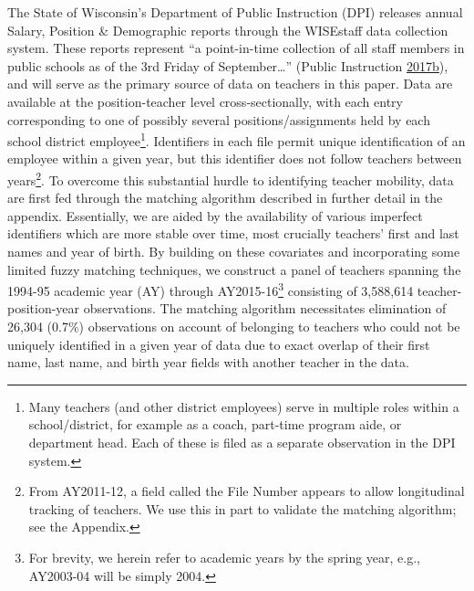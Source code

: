 \documentclass[12pt,]{article}
\let\rmarkdownfootnote\footnote%
\def\footnote{\protect\rmarkdownfootnote}
\begin{document}
The State of Wisconsin's Department of Public Instruction (DPI) releases
annual Salary, Position \& Demographic reports through the WISEstaff
data collection system. These reports represent ``a point-in-time
collection of all staff members in public schools as of the 3rd Friday
of September\ldots{}'' (Public Instruction
\protect\hyperlink{ref-dpi}{2017}\protect\hyperlink{ref-dpi}{b}), and
will serve as the primary source of data on teachers in this paper. Data
are available at the position-teacher level cross-sectionally, with each
entry corresponding to one of possibly several positions/assignments
held by each school district employee\footnote{Many teachers (and other
  district employees) serve in multiple roles within a school/district,
  for example as a coach, part-time program aide, or department head.
  Each of these is filed as a separate observation in the DPI system.}.
Identifiers in each file permit unique identification of an employee
within a given year, but this identifier does not follow teachers
between years\footnote{From AY2011-12, a field called the File Number
  appears to allow longitudinal tracking of teachers. We use this in
  part to validate the matching algorithm; see the Appendix.}. To
overcome this substantial hurdle to identifying teacher mobility, data
are first fed through the matching algorithm described in further detail
in the appendix. Essentially, we are aided by the availability of
various imperfect identifiers which are more stable over time, most
crucially teachers' first and last names and year of birth. By building
on these covariates and incorporating some limited fuzzy matching
techniques, we construct a panel of teachers spanning the 1994-95
academic year (AY) through AY2015-16\footnote{For brevity, we herein
  refer to academic years by the spring year, e.g., AY2003-04 will be
  simply 2004.} consisting of 3,588,614 teacher-position-year
observations. The matching algorithm necessitates elimination of 26,304
(0.7\%) observations on account of belonging to teachers who could not
be uniquely identified in a given year of data due to exact overlap of
their first name, last name, and birth year fields with another teacher
in the data.
\end{document}
